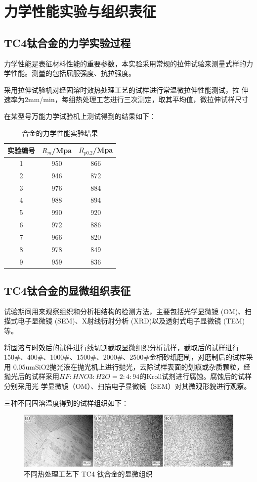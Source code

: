 \chapter{力学性能实验与组织表征}

\section{TC4钛合金的力学实验过程}
力学性能是表征材料性能的重要参数，本实验采用常规的拉伸试验来测量式样的力学性能。测量的包括屈服强度、抗拉强度。

采用拉伸试验机对经固溶时效热处理工艺的试样进行常温微拉伸性能测试，拉 伸速率为2mm/min，每组热处理工艺进行三次测定，取其平均值，微拉伸试样尺寸

在某型号万能力学试验机上测试得到的结果如下：

\begin{table}[htbp]
	\centering
	\caption{\ti 合金的力学性能实验结果}
	\label{sec:mystrength}
		\begin{tabular}{ccc}
			\toprule
			实验编号&$ R_m $/Mpa&$ R_{p0.2} $/Mpa \\
			\midrule
			1 & 950 & 866\\
			2 & 946 & 872\\
			3 & 976 & 884\\
			4 & 988 & 894\\
			5 & 990 & 920\\
			6 & 972 & 886\\
			7 & 966 & 820\\
			8 & 978 & 849\\
			9 & 959 & 836\\
			\bottomrule
		\end{tabular}
\end{table}
\section{TC4钛合金的显微组织表征}
试验期间用来观察组织和分析相结构的检测方法，主要包括光学显微镜 (OM)、扫描式电子显微镜 (SEM)、X射线衍射分析 (XRD)以及透射式电子显微镜 (TEM)等。

将固溶与时效后的试件进行线切割截取显微组织分析试样，截取后的试样进行 150\#、400\#、1000\#、1500\#、2000\#、2500\#金相砂纸磨制，对磨制后的试样采用 0.05umSiO2抛光液在抛光机上进行抛光，去除试样表面的划痕或杂质颗粒，经抛光后的试样采用$ HF:HNO3:H2O=2:4:94 $的Kroll试剂进行腐蚀。腐蚀后的试样分别采用光 学显微镜（OM）、扫描电子显微镜（SEM）对其微观形貌进行观察。


三种不同固溶温度得到的试样组织如下：
\begin{figure}[h!]
	\centering
	\includegraphics[width=0.7\linewidth]{pic/demo-mico}
	\caption{不同热处理工艺下 TC4 钛合金的显微组织}
	\label{fig:demo-mico}
\end{figure}
